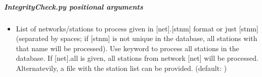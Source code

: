 \documentclass[letterpaper,10pt,english]{sphinxmanual}
\begin{document}
\begin{sphinxVerbatim}[commandchars=\\\{\}]
 \PYG{p}{[}\PYG{p}{]} \PYG{p}{[}  \PYG{p}{[} \PYG{p}{]}\PYG{p}{]} \PYG{p}{[} \PYG{p}{]} \PYG{p}{[}\PYG{p}{]} \PYG{p}{[}\PYG{p}{]}
                  \PYG{p}{[}\PYG{p}{]} \PYG{p}{[} \PYG{p}{[}\PYG{p}{]}\PYG{p}{]} \PYG{p}{[}\PYG{p}{]} \PYG{p}{[} \PYG{p}{[}\PYG{p}{]}\PYG{p}{]} \PYG{p}{[}\PYG{p}{]}
                  \PYG{p}{[} \PYG{p}{]} \PYG{p}{[} \PYG{p}{]} \PYG{p}{[} \PYG{p}{]} \PYG{p}{[}\PYG{p}{]}
                  \PYG{p}{[}  \PYG{p}{]} \PYG{p}{[}   \PYG{p}{]}
                  \PYG{p}{[}\PYG{p}{]}
                   \PYG{p}{[} \PYG{p}{]}
\end{sphinxVerbatim}


\subparagraph{IntegrityCheck.py positional arguments}
\label{\detokenize{pgamit.com:IntegrityCheck.py-positional-arguments}}\begin{itemize}
\item {} 
\sphinxAtStartPar
{\hyperref[\detokenize{pgamit.com:IntegrityCheck.py-all|net.stnm}]{}} \sphinxhyphen{} List of networks/stations to process given in {[}net{]}.{[}stnm{]} format or just {[}stnm{]} (separated by spaces; if {[}stnm{]} is not unique in the database, all stations with that name will be processed). Use keyword  to process all stations in the database. If {[}net{]}.all is given, all stations from network {[}net{]} will be processed. Alternatevily, a file with the station list can be provided. (default: )

\end{itemize}
\end{document}
